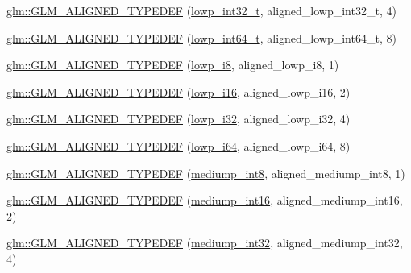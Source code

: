 \begin{DoxyCompactItemize}
\hyperlink{group__gtx__type__aligned_ga8130ea381d76a2cc34a93ccbb6cf487d}{glm\+::\+G\+L\+M\+\_\+\+A\+L\+I\+G\+N\+E\+D\+\_\+\+T\+Y\+P\+E\+D\+EF} (\hyperlink{group__gtc__type__precision_gad9567c806dc39f534174eef42663119d}{lowp\+\_\+int32\+\_\+t}, aligned\+\_\+lowp\+\_\+int32\+\_\+t, 4)
\item 
\hyperlink{group__gtx__type__aligned_ga7ccb60f3215d293fd62b33b31ed0e7be}{glm\+::\+G\+L\+M\+\_\+\+A\+L\+I\+G\+N\+E\+D\+\_\+\+T\+Y\+P\+E\+D\+EF} (\hyperlink{group__gtc__type__precision_ga14d72e76d57c7f28eca8e933816c9fd6}{lowp\+\_\+int64\+\_\+t}, aligned\+\_\+lowp\+\_\+int64\+\_\+t, 8)
\item 
\hyperlink{group__gtx__type__aligned_gac20d508d2ef5cc95ad3daf083c57ec2a}{glm\+::\+G\+L\+M\+\_\+\+A\+L\+I\+G\+N\+E\+D\+\_\+\+T\+Y\+P\+E\+D\+EF} (\hyperlink{group__gtc__type__precision_gaa2e13ee29c90f75658beed6082541097}{lowp\+\_\+i8}, aligned\+\_\+lowp\+\_\+i8, 1)
\item 
\hyperlink{group__gtx__type__aligned_ga50257b48069a31d0c8d9c1f644d267de}{glm\+::\+G\+L\+M\+\_\+\+A\+L\+I\+G\+N\+E\+D\+\_\+\+T\+Y\+P\+E\+D\+EF} (\hyperlink{group__gtc__type__precision_gaf7bbfd31bcec25a416ea94d09efb5451}{lowp\+\_\+i16}, aligned\+\_\+lowp\+\_\+i16, 2)
\item 
\hyperlink{group__gtx__type__aligned_gaa07e98e67b7a3435c0746018c7a2a839}{glm\+::\+G\+L\+M\+\_\+\+A\+L\+I\+G\+N\+E\+D\+\_\+\+T\+Y\+P\+E\+D\+EF} (\hyperlink{group__gtc__type__precision_ga70fd34e8b8cffc92739161284ed77328}{lowp\+\_\+i32}, aligned\+\_\+lowp\+\_\+i32, 4)
\item 
\hyperlink{group__gtx__type__aligned_ga62601fc6f8ca298b77285bedf03faffd}{glm\+::\+G\+L\+M\+\_\+\+A\+L\+I\+G\+N\+E\+D\+\_\+\+T\+Y\+P\+E\+D\+EF} (\hyperlink{group__gtc__type__precision_ga1f4ded25f71c0f3b4518936d50b54b6e}{lowp\+\_\+i64}, aligned\+\_\+lowp\+\_\+i64, 8)
\item 
\hyperlink{group__gtx__type__aligned_gac8cff825951aeb54dd846037113c72db}{glm\+::\+G\+L\+M\+\_\+\+A\+L\+I\+G\+N\+E\+D\+\_\+\+T\+Y\+P\+E\+D\+EF} (\hyperlink{group__gtc__type__precision_ga3ee8faab2278c44c5785af04b7b18a14}{mediump\+\_\+int8}, aligned\+\_\+mediump\+\_\+int8, 1)
\item 
\hyperlink{group__gtx__type__aligned_ga78f443d88f438575a62b5df497cdf66b}{glm\+::\+G\+L\+M\+\_\+\+A\+L\+I\+G\+N\+E\+D\+\_\+\+T\+Y\+P\+E\+D\+EF} (\hyperlink{group__gtc__type__precision_ga4611997edb6c61606daa11990cf08798}{mediump\+\_\+int16}, aligned\+\_\+mediump\+\_\+int16, 2)
\item 
\hyperlink{group__gtx__type__aligned_ga0680cd3b5d4e8006985fb41a4f9b57af}{glm\+::\+G\+L\+M\+\_\+\+A\+L\+I\+G\+N\+E\+D\+\_\+\+T\+Y\+P\+E\+D\+EF} (\hyperlink{group__gtc__type__precision_ga0660a752402702f420f13c686a7fff29}{mediump\+\_\+int32}, aligned\+\_\+mediump\+\_\+int32, 4)

\end{DoxyCompactItemize}
